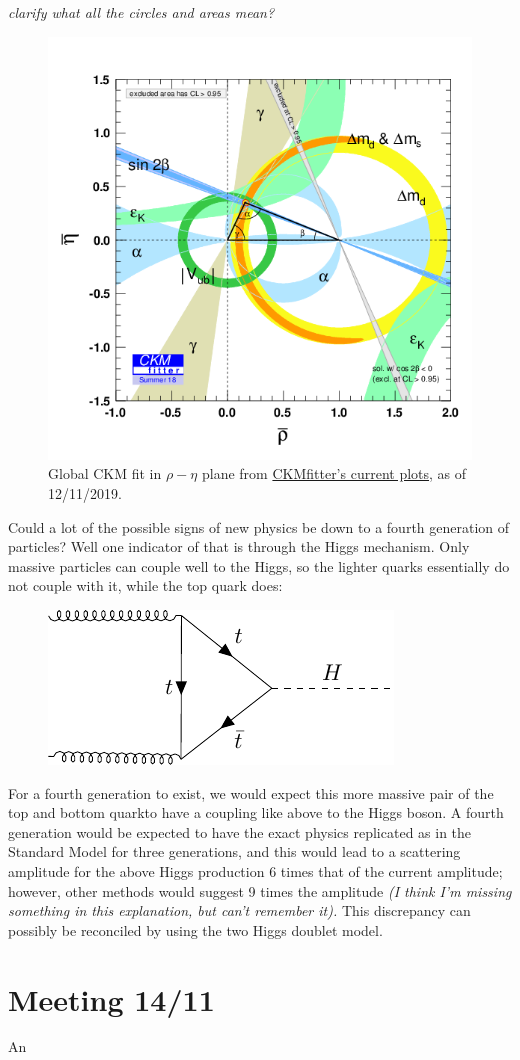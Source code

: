 \documentclass[a4paper, 11pt, normalem]{article}
\begin{document}
\textit{clarify what all the circles and areas mean?}
\begin{figure}[H]
    \centering
    \includegraphics[scale=0.6]{rhoeta_large.png}
    \caption{Global CKM fit in $\rho-\eta$ plane from \href{http://ckmfitter.in2p3.fr/www/results/plots_summer18/ckm_res_summer18.html}{CKMfitter's current plots}, as of 12/11/2019.}
\end{figure}

Could a lot of the possible signs of new physics be down to a fourth generation of particles?
Well one indicator of that is through the Higgs mechanism.
Only massive particles can couple well to the Higgs, so the lighter quarks essentially do not couple with it, while the top quark does:
\begin{figure}[H]
    \centering
    \includegraphics{higgs.pdf}
\end{figure}
For a fourth generation to exist, we would expect this more massive pair of the top and bottom quarkto have a coupling like above to the Higgs boson. 
A fourth generation would be expected to have the exact physics replicated as in the Standard Model for three generations, and this would lead to a scattering amplitude for the above Higgs production 6 times that of the current amplitude; however, other methods would suggest 9 times the amplitude \textit{(I think I'm missing something in this explanation, but can't remember it).}
This discrepancy can possibly be reconciled by using the two Higgs doublet model.

\section*{Meeting 14/11}
An 
\end{document}
